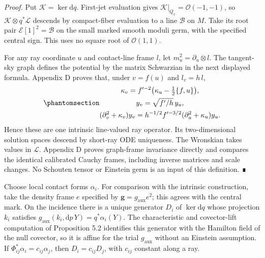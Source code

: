 \documentclass[
  english,
  11pt,
  reqno]{amsart}
\begin{document}
\emph{Proof.} Put \(\mathcal K=\ker\mathrm dq\). First-jet evaluation
gives \(\mathcal K|_{Q_x}=\mathcal O(-1,-1)\), so
\(\mathcal K\otimes q^*\mathcal L\) descends by compact-fiber evaluation
to a line \(\mathcal B\) on \(M\). Take its root pair
\(\mathcal E[1]^2=\mathcal B\) on the small marked smooth moduli germ,
with the specified central sign. This uses no square root of
\(\mathcal O(1,1)\).

For any ray coordinate \(u\) and contact-line frame \(l\), let
\(m_u^2=\partial_u\otimes l\). The tangent-sky graph defines the
potential by the matrix Schwarzian in the next displayed formula.
Appendix D proves that, under \(v=f(u)\) and \(l_v=h\,l\),
\begin{equation}\protect\phantomsection\label{eq:gg-projective-optical-definition}{\begin{gathered}
\kappa_v=f'^{-2}\big(\kappa_u-\tfrac12\{f,u\}\big), \\
y_v=\sqrt{f'/h}\,y_u, \\
(\partial_v^2+\kappa_v)y_v
  =h^{-1/2}f'^{-3/2}(\partial_u^2+\kappa_u)y_u .
\end{gathered}}\end{equation} Hence these are one intrinsic line-valued ray operator.
Its two-dimensional solution spaces descend by short-ray ODE uniqueness.
The Wronskian takes values in \(\mathcal L\). Appendix D proves
graph-frame invariance directly and compares the identical calibrated
Cauchy frames, including inverse matrices and scale changes. No Schouten
tensor or Einstein germ is an input of this definition. ∎

Choose local contact forms \(\alpha_i\). For comparison with the
intrinsic construction, take the density frame \(e\) specified by
\(\boldsymbol g=g_{\mathrm{aux}}e^2\); this agrees with the central
mark. On the incidence there is a unique generator \(D_i\) of
\(\ker\mathrm dq\) whose projection \(k_i\) satisfies
\(g_{\mathrm{aux}}(k_i,\mathrm dp\,Y)=q^*\alpha_i(Y)\). The
characteristic and covector-lift computation of Proposition 5.2
identifies this generator with the Hamilton field of the null covector,
so it is affine for the trial \(g_{\mathrm{aux}}\) without an Einstein
assumption. If \(\Phi_{ij}^*\alpha_i=c_{ij}\alpha_j\), then
\(D_i=c_{ij}D_j\), with \(c_{ij}\) constant along a ray.
\end{document}
